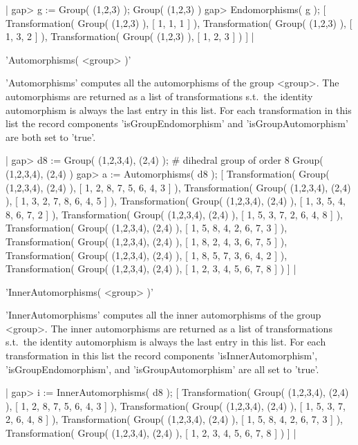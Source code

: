 |  gap> g := Group( (1,2,3) );                                         
  Group( (1,2,3) )
  gap> Endomorphisms( g );
  [ Transformation( Group( (1,2,3) ), [ 1, 1, 1 ] ), 
    Transformation( Group( (1,2,3) ), [ 1, 3, 2 ] ), 
    Transformation( Group( (1,2,3) ), [ 1, 2, 3 ] ) ]
|

   
'Automorphisms( <group> )'  

'Automorphisms' computes all the automorphisms of the group <group>. 
The automorphisms are returned as a list of transformations s.t.\ 
the identity automorphism is always the last entry in this list. For each  
transformation in this list the record components 
'is\-Group\-En\-do\-mor\-phism' 
and 'is\-Group\-Auto\-mor\-phism' are both set to 'true'.

|  gap> d8 := Group( (1,2,3,4), (2,4) ); # dihedral group of order 8
  Group( (1,2,3,4), (2,4) )
  gap> a := Automorphisms( d8 );
  [ Transformation( Group( (1,2,3,4), (2,4) ), [ 1, 2, 8, 7, 5, 6, 4, 3 
       ] ), Transformation( Group( (1,2,3,4), (2,4) ), 
      [ 1, 3, 2, 7, 8, 6, 4, 5 ] ), Transformation( Group( (1,2,3,4), 
      (2,4) ), [ 1, 3, 5, 4, 8, 6, 7, 2 ] ), 
    Transformation( Group( (1,2,3,4), (2,4) ), [ 1, 5, 3, 7, 2, 6, 4, 8 
       ] ), Transformation( Group( (1,2,3,4), (2,4) ), 
      [ 1, 5, 8, 4, 2, 6, 7, 3 ] ), Transformation( Group( (1,2,3,4), 
      (2,4) ), [ 1, 8, 2, 4, 3, 6, 7, 5 ] ), 
    Transformation( Group( (1,2,3,4), (2,4) ), [ 1, 8, 5, 7, 3, 6, 4, 2 
       ] ), Transformation( Group( (1,2,3,4), (2,4) ), 
      [ 1, 2, 3, 4, 5, 6, 7, 8 ] ) ]
|

\Section{InnerAutomorphisms}
   
'InnerAutomorphisms( <group> )'  

'InnerAutomorphisms' computes all the inner automorphisms of the group 
<group>. 
The inner automorphisms are returned as a list of transformations s.t.\ 
the identity automorphism is always the last entry in this list. For each  
transformation in this list the record components 
'is\-Inner\-Auto\-mor\-phism', 
'is\-Group\-En\-do\-mor\-phism', 
and 'is\-Group\-Auto\-mor\-phism' are all set to 'true'.

|  gap> i := InnerAutomorphisms( d8 );
  [ Transformation( Group( (1,2,3,4), (2,4) ), [ 1, 2, 8, 7, 5, 6, 4, 3 
       ] ), Transformation( Group( (1,2,3,4), (2,4) ), 
      [ 1, 5, 3, 7, 2, 6, 4, 8 ] ), Transformation( Group( (1,2,3,4), 
      (2,4) ), [ 1, 5, 8, 4, 2, 6, 7, 3 ] ), 
    Transformation( Group( (1,2,3,4), (2,4) ), [ 1, 2, 3, 4, 5, 6, 7, 8 
       ] ) ]
|

